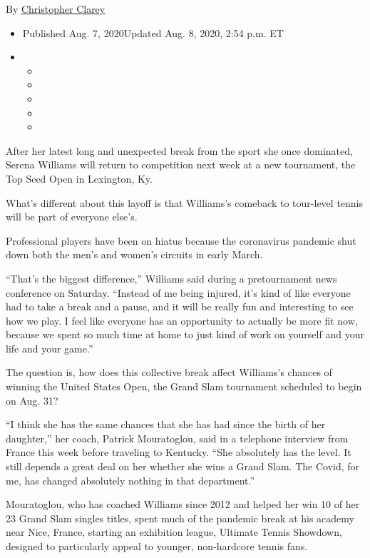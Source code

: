 By \href{https://www.nytimes.com/by/christopher-clarey}{Christopher
Clarey}

\begin{itemize}
\item
  Published Aug. 7, 2020Updated Aug. 8, 2020, 2:54 p.m. ET
\item
  \begin{itemize}
  \item
  \item
  \item
  \item
  \item
  \end{itemize}
\end{itemize}

After her latest long and unexpected break from the sport she once
dominated, Serena Williams will return to competition next week at a new
tournament, the Top Seed Open in Lexington, Ky.

What's different about this layoff is that Williams's comeback to
tour-level tennis will be part of everyone else's.

Professional players have been on hiatus because the coronavirus
pandemic shut down both the men's and women's circuits in early March.

``That's the biggest difference,'' Williams said during a pretournament
news conference on Saturday. ``Instead of me being injured, it's kind of
like everyone had to take a break and a pause, and it will be really fun
and interesting to see how we play. I feel like everyone has an
opportunity to actually be more fit now, because we spent so much time
at home to just kind of work on yourself and your life and your game.''

The question is, how does this collective break affect Williams's
chances of winning the United States Open, the Grand Slam tournament
scheduled to begin on Aug. 31?

``I think she has the same chances that she has had since the birth of
her daughter,'' her coach, Patrick Mouratoglou, said in a telephone
interview from France this week before traveling to Kentucky. ``She
absolutely has the level. It still depends a great deal on her whether
she wins a Grand Slam. The Covid, for me, has changed absolutely nothing
in that department.''

Mouratoglou, who has coached Williams since 2012 and helped her win 10
of her 23 Grand Slam singles titles, spent much of the pandemic break at
his academy near Nice, France, starting an exhibition league, Ultimate
Tennis Showdown, designed to particularly appeal to younger,
non-hardcore tennis fans.


